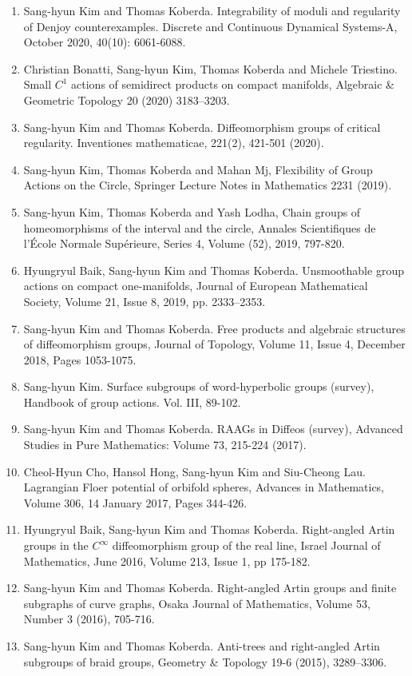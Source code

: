 \documentclass[11pt,a4paper]{article}
\begin{document}
\begin{enumerate}[leftmargin=1.5em, label=\arabic*.]
\item Sang-hyun Kim and Thomas Koberda. Integrability of moduli and regularity of Denjoy counterexamples. Discrete and Continuous Dynamical Systems-A, October 2020, 40(10): 6061-6088.
\item Christian Bonatti, Sang-hyun Kim, Thomas Koberda and Michele Triestino. Small $C^1$ actions of semidirect products on compact manifolds, Algebraic \& Geometric Topology 20 (2020) 3183--3203.
\item Sang-hyun Kim and Thomas Koberda. Diffeomorphism groups of critical regularity. Inventiones mathematicae, 221(2), 421-501 (2020).
\item Sang-hyun Kim, Thomas Koberda and Mahan Mj, Flexibility of Group Actions on the Circle, Springer Lecture Notes in Mathematics 2231 (2019).
\item Sang-hyun Kim, Thomas Koberda and Yash Lodha, Chain groups of homeomorphisms of the interval and the circle, Annales Scientifiques de l'\'Ecole Normale Sup\'erieure, Series 4, Volume (52), 2019, 797-820.
\item Hyungryul Baik, Sang-hyun Kim and Thomas Koberda. Unsmoothable group actions on compact one-manifolds, Journal of European Mathematical Society, Volume 21, Issue 8, 2019, pp. 2333--2353.
\item Sang-hyun Kim and Thomas Koberda. Free products and algebraic structures of diffeomorphism groups, Journal of Topology, Volume 11, Issue 4, December 2018, Pages 1053-1075.
\item Sang-hyun Kim. Surface subgroups of word-hyperbolic groups (survey), Handbook of group actions. Vol. III, 89-102.
\item Sang-hyun Kim and Thomas Koberda. RAAGs in Diffeos (survey), Advanced Studies in Pure Mathematics: Volume 73, 215-224 (2017).
\item Cheol-Hyun Cho, Hansol Hong, Sang-hyun Kim and Siu-Cheong Lau. Lagrangian Floer potential of orbifold spheres, Advances in Mathematics, Volume 306, 14 January 2017, Pages 344-426.
\item Hyungryul Baik, Sang-hyun Kim and Thomas Koberda. Right-angled Artin groups in the $C^{\infty}$ diffeomorphism group of the real line, Israel Journal of Mathematics, June 2016, Volume 213, Issue 1, pp 175-182.
\item Sang-hyun Kim and Thomas Koberda. Right-angled Artin groups and finite subgraphs of curve graphs, Osaka Journal of Mathematics, Volume 53, Number 3 (2016), 705-716.
\item Sang-hyun Kim and Thomas Koberda. Anti-trees and right-angled Artin subgroups of braid groups, Geometry \& Topology 19-6 (2015), 3289--3306.

\end{enumerate}
\end{document}
